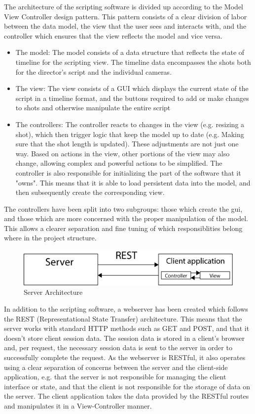 \documentclass[11pt,twoside,a4paper]{article}
\begin{document}
The architecture of the scripting software is divided up according to the Model View Controller design pattern. This pattern consists of a clear division of labor between the data model, the view that the user sees and interacts with, and the controller which ensures that the view reflects the model and vice versa.
\begin{itemize}
    \item The model: The model consists of a data structure that reflects the state of timeline for the scripting view. The timeline data encompasses the shots both for the director's script and the individual cameras.
    \item The view: The view consists of a GUI which displays the current state of the script in a timeline format, and the buttons required to add or make changes to shots and otherwise manipulate the entire script
    \item The controllers: The controller reacts to changes in the view (e.g. resizing a shot), which then trigger logic that keep the model up to date (e.g. Making sure that the shot length is updated). These adjustments are not just one way. Based on actions in the view, other portions of the view may also change, allowing complex and powerful actions to be simplified. The controller is also responsible for initializing the part of the software that it "owns". This means that it is able to load persistent data into the model, and then subsequently create the corresponding view.
\end{itemize}
The controllers have been split into two subgroups: those which create the gui, and those which are more concerned with the proper manipulation of the model. This allows a clearer separation and fine tuning of which responsiblities belong where in the project structure.\\
\begin{figure}[H]
	\centering
	\includegraphics[width=\textwidth]{server-decomposition}
	\caption{Server Architecture}
	\label{fig:archdecomp}
\end{figure}
In addition to the scripting software, a webserver has been created which follows the REST (Representational State Transfer) architecture. This means that the server works with standard HTTP methods such as GET and POST, and that it doesn't store client session data. The session data is stored in a client's browser and, per request, the necessary session data is sent to the server in order to successfully complete the request. As the webserver is RESTful, it also operates using a clear separation of concerns between the server and the client-side application, e.g. that the server is not responsible for managing the client interface or state, and that the client is not responsible for the storage of data on the server. The client application takes the data provided by the RESTful routes and manipulates it in a View-Controller manner.
\end{document}
